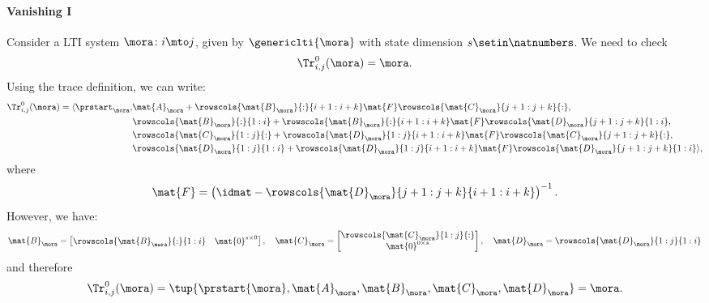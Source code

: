 \begin{example}
    \paragraph*{Vanishing I}
    Consider a LTI system $\mora\colon i\mto j$, given by $\genericlti{\mora}$ with state dimension $s\setin \natnumbers$.
    We need to check
    \begin{equation*}
        \Tr_{i,j}^0 (\mora)=\mora.
    \end{equation*}
    Using the trace definition, we can write:
    \begin{equation*}
        \begin{aligned}
            \Tr_{i,j}^0 (\mora)=\langle\prstart_{\mora}, & \mat{A}_\mora+\rowscols{\mat{B}_{\mora}}{:}{i+1:i+k}\mat{F}\rowscols{\mat{C}_{\mora}}{j+1:j+k}{:}, \\
                                                         & \rowscols{\mat{B}_{\mora}}{:}{1:i}+ \rowscols{\mat{B}_{\mora}}{:}{i+1:i+k}\mat{F}\rowscols{\mat{D}_{\mora}}{j+1:j+k}{1:i}, \\
                                                         & \rowscols{\mat{C}_{\mora}}{1:j}{:}+\rowscols{\mat{D}_{\mora}}{1:j}{i+1:i+k}\mat{F}\rowscols{\mat{C}_{\mora}}{j+1:j+k}{:}, \\
                                                         & \rowscols{\mat{D}_{\mora}}{1:j}{1:i}+ \rowscols{\mat{D}_{\mora}}{1:j}{i+1:i+k}\mat{F}\rowscols{\mat{D}_{\mora}}{j+1:j+k}{1:i}\rangle,
        \end{aligned}
    \end{equation*}
    where
    \begin{equation*}
        \mat{F}=\left(\idmat - \rowscols{\mat{D}_{\mora}}{j+1:j+k}{i+1:i+k}\right)^{-1}.
    \end{equation*}
    However, we have:
    \begin{equation*}
        \mat{B}_\mora=\begin{bmatrix}
            \rowscols{\mat{B}_{\mora}}{:}{1:i} & \mat{0}^{s\times 0}
        \end{bmatrix},\quad
        \mat{C}_\mora=\begin{bmatrix}
            \rowscols{\mat{C}_{\mora}}{1:j}{:} \\ \mat{0}^{0\times s}
        \end{bmatrix},
        \quad
        \mat{D}_\mora= \rowscols{\mat{D}_\mora}{1:j}{1:i}
    \end{equation*}
    and therefore
    \begin{equation*}
        \Tr_{i,j}^0 (\mora)=\tup{\prstart{\mora}, \mat{A}_\mora, \mat{B}_\mora, \mat{C}_\mora, \mat{D}_\mora}=\mora.
    \end{equation*}


\end{example}
